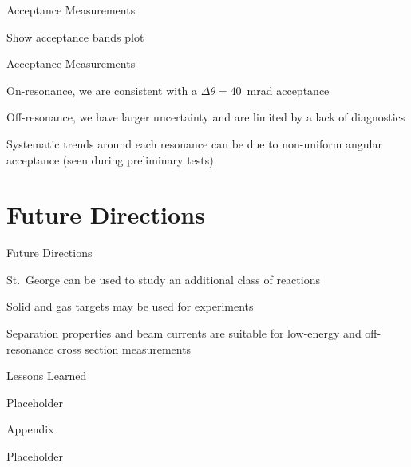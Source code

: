 \documentclass[10pt]{beamer}
\begin{document}
\begin{frame}[fragile]{Acceptance Measurements}

    Show acceptance bands plot

\end{frame}

\begin{frame}[fragile]{Acceptance Measurements}

    On-resonance, we are consistent with a $\Delta\theta = 40$~mrad
    acceptance

    Off-resonance, we have larger uncertainty and are limited by a lack
    of diagnostics

    Systematic trends around each resonance can be due to non-uniform
    angular acceptance (seen during preliminary tests)

\end{frame}

\section{Future Directions}

\begin{frame}[fragile]{Future Directions}

    St.\ George can be used to study an additional class of reactions

    Solid and gas targets may be used for experiments

    Separation properties and beam currents are suitable for low-energy
    and off-resonance cross section measurements

\end{frame}

\begin{frame}[fragile]{Lessons Learned}

    Placeholder

\end{frame}

\appendix

\begin{frame}[fragile]{Appendix}

    Placeholder

\end{frame}

%   
%   
\end{document}
